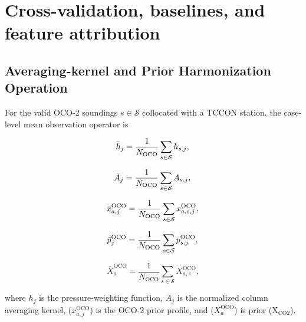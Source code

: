 \section{Cross-validation, baselines, and feature attribution}
\label{app:evaluation}




\subsection{Averaging-kernel and Prior Harmonization Operation}
\label{app:ak_operation}
For the valid OCO-2 soundings \(s\in\mathcal S\) collocated with a TCCON station, the case-level mean observation operator is



\begin{equation}
    \bar{h}_j = \frac{1}{N_{\mathrm{OCO}}}
             \sum_{s\in\mathcal{S}} h_{s,j}, \\
\end{equation}

\begin{equation}
    \bar{A}_j = \frac{1}{N_{\mathrm{OCO}}}
             \sum_{s\in\mathcal{S}} A_{s,j}, \\
\end{equation}

\begin{equation}
    \bar{x}_{a,j}^{\mathrm{OCO}} =
             \frac{1}{N_{\mathrm{OCO}}}
             \sum_{s\in\mathcal{S}} x_{a,s,j}^{\mathrm{OCO}}, \\
\end{equation}

\begin{equation}
    \bar{p}_j^{\mathrm{OCO}} =
             \frac{1}{N_{\mathrm{OCO}}}
             \sum_{s\in\mathcal{S}} p_{s,j}^{\mathrm{OCO}}, \\
\end{equation}

\begin{equation}
    \bar{X}_{a}^{\mathrm{OCO}} =
             \frac{1}{N_{\mathrm{OCO}}}
             \sum_{s\in\mathcal{S}} X_{a,s}^{\mathrm{OCO}},
\end{equation}




where \(h_j\) is the pressure-weighting function, \(A_j\) is the normalized column averaging kernel, ($x_{a,j}^{\mathrm{OCO}}$) is the OCO-2 prior profile, and ($X_a^{\mathrm{OCO}}$) is prior ($\mathrm{X_{CO2}}$).



